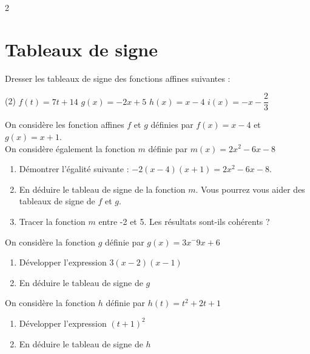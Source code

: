 \documentclass[10pt,a4paper]{article}
\begin{document}
\begin{multicols}{2}
\section{Tableaux de signe}

\begin{exo}[][]
    Dresser les tableaux de signe des fonctions affines suivantes :
    \begin{tasks}(2)
        \task \(f(t) = 7t+14\)
        \task \(g(x) = -2x+5\)
        \task \(h(x) = x-4\)
        \task \(i(x) = -x-\dfrac{2}{3}\)
    \end{tasks}
\end{exo}


\begin{exo}[][]
    On considère les fonction affines \(f\) et \(g\) définies par \(f(x) = x-4\) et \(g(x) = x+1\).\\
    On considère également la fonction \(m\) définie par \(m(x)=2x^2-6x-8\)
    \begin{enumerate}
        \item Démontrer l'égalité suivante : \(-2(x-4)(x+1) = 2x^2-6x-8\).
        \item En déduire le tableau de signe de la fonction \(m\). Vous pourrez vous aider des tableaux de signe de \(f\) et \(g\).
        \item Tracer la fonction \(m\) entre -2 et 5. Les résultats sont-ils cohérents ?
    \end{enumerate}
\end{exo}


\begin{exo}[][]
    On considère la fonction \(g\) définie par \(g(x) = 3x^-9x+6\)
    \begin{enumerate}
        \item Développer l'expression \(3(x-2)(x-1)\)
        \item En déduire le tableau de signe de \(g\)
    \end{enumerate}
\end{exo}

\begin{exo}[][]
    On considère la fonction \(h\) définie par \(h(t) = t^2+2t+1\)
    \begin{enumerate}
        \item Développer l'expression \((t+1)^2\)
        \item En déduire le tableau de signe de \(h\)
    \end{enumerate}
\end{exo}
\end{multicols}
\end{document}
